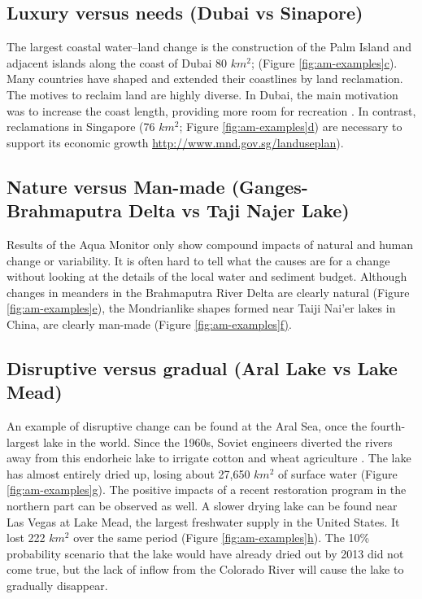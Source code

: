 \subsection{Luxury versus needs (Dubai vs Sinapore)}
The largest coastal water–land change is the construction of the Palm Island and adjacent islands along the coast of Dubai 80 $km^2$; (Figure \hyperref[fig:am-examples]{\ref{fig:am-examples}c}). Many countries have shaped and extended their coastlines by land reclamation. The motives to reclaim land are highly diverse. In Dubai, the main motivation was to increase the coast length, providing more room for recreation \citet{Davidson2009}. In contrast, reclamations in Singapore (76 $km^2$; Figure \hyperref[fig:am-examples]{\ref{fig:am-examples}d}) are necessary to support its economic growth \url{http://www.mnd.gov.sg/landuseplan}).

\subsection{Nature versus Man-made (Ganges-Brahmaputra Delta vs Taji Najer Lake)}
Results of the Aqua Monitor only show compound impacts of natural and human change or variability. It is often hard to tell what the causes are for a change without looking at the details of the local water
and sediment budget. Although changes in meanders in the Brahmaputra River Delta are clearly natural (Figure \hyperref[fig:am-examples]{\ref{fig:am-examples}e}), the Mondrianlike shapes formed near Taiji Nai’er lakes in China, are clearly man-made (Figure \hyperref[fig:am-examples]{\ref{fig:am-examples}f)}.

\subsection{Disruptive versus gradual (Aral Lake vs Lake Mead)}
An example of disruptive change can be found at the Aral Sea, once the fourth-largest lake in the world. Since the 1960s, Soviet engineers diverted the rivers away from this endorheic lake to irrigate cotton and wheat agriculture \citet{Glantz1999}. The lake has almost entirely dried up, losing about 27,650 $km^2$ of surface water (Figure \hyperref[fig:am-examples]{\ref{fig:am-examples}g}). The positive impacts of a recent restoration program \citet{Micklin2016} in the northern part can be observed as well. A slower drying lake can be found near Las Vegas at Lake Mead, the largest freshwater supply in the United States. It lost 222 $km^2$ over the same period (Figure \hyperref[fig:am-examples]{\ref{fig:am-examples}h}). The 10\% probability scenario that the lake would have already dried out by 2013 \citet{Barnett2008} did not come true, but the lack of inflow from the Colorado River will cause the lake to gradually disappear.

